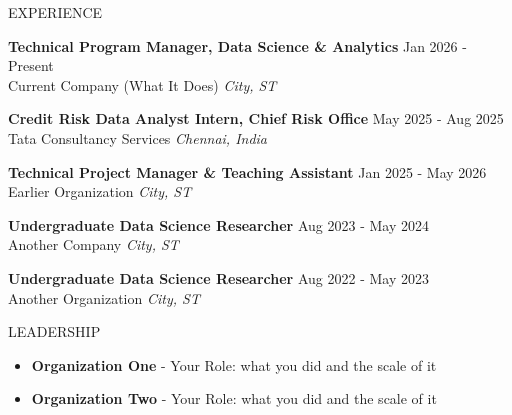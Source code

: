 \documentclass{resume}
\begin{document}
\vspace{-12pt}
\begin{rSection}{EXPERIENCE}

\textbf{Technical Program Manager, Data Science \& Analytics} \hfill Jan 2026 - Present\\
Current Company (What It Does) \hfill \textit{City, ST}
\begin{itemize}
    \itemsep -3pt {}
\end{itemize}

\textbf{Credit Risk Data Analyst Intern, Chief Risk Office} \hfill May 2025 - Aug 2025\\
Tata Consultancy Services \hfill \textit{Chennai, India}
\begin{itemize}
    \itemsep -3pt {}
\end{itemize}

\textbf{Technical Project Manager \& Teaching Assistant} \hfill Jan 2025 - May 2026\\
Earlier Organization \hfill \textit{City, ST}
\begin{itemize}
    \itemsep -3pt {}
\end{itemize}

\textbf{Undergraduate Data Science Researcher} \hfill Aug 2023 - May 2024\\
Another Company \hfill \textit{City, ST}
\begin{itemize}
    \itemsep -3pt {}
\end{itemize}

\textbf{Undergraduate Data Science Researcher} \hfill Aug 2022 - May 2023\\
Another Organization \hfill \textit{City, ST}
\begin{itemize}
    \itemsep -3pt {}
\end{itemize}

\end{rSection}

\vspace{-8pt}
\begin{rSection}{LEADERSHIP}
\begin{itemize}
    \itemsep -3pt {}
    \item \textbf{Organization One} - Your Role: what you did and the scale of it
    \item \textbf{Organization Two} - Your Role: what you did and the scale of it
\end{itemize}
\end{rSection}

\end{document}
